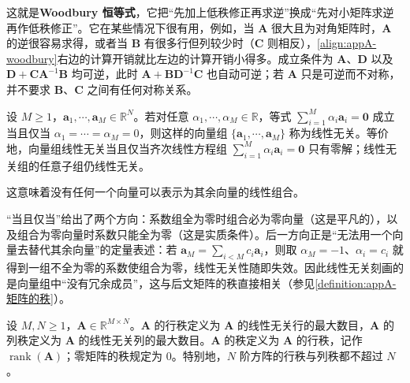 \documentclass[../main.tex]{subfiles}
\begin{document}
\begin{remark}
这就是\textbf{Woodbury 恒等式}，它把“先加上低秩修正再求逆”换成“先对小矩阵求逆再作低秩修正”。它在某些情况下很有用，例如，当 $\bm{A}$ 很大且为对角矩阵时，$\bm{A}$ 的逆很容易求得，或者当 $\bm{B}$ 有很多行但列较少时（$\bm{C}$ 则相反），\eqref{align:appA-woodbury}右边的计算开销就比左边的计算开销小得多。成立条件为 $\bm{A}$、$\bm{D}$ 以及 $\bm{D}+\bm{C}\bm{A}^{-1}\bm{B}$ 均可逆，此时 $\bm{A}+\bm{B}\bm{D}^{-1}\bm{C}$ 也自动可逆；若 $\bm{A}$ 只是可逆而不对称，并不要求 $\bm{B}$、$\bm{C}$ 之间有任何对称关系。
\end{remark}


\begin{definition}[线性无关]\label{definition:appA-线性无关}
设 $M\geqslant1$，$\bm{a}_1,\cdots,\bm{a}_M\in\mathbb{R}^{N}$。若对任意 $\alpha_1,\cdots,\alpha_M\in\mathbb{R}$，等式 $\sum_{i=1}^{M}\alpha_i\bm{a}_i=\bm{0}$ 成立当且仅当 $\alpha_1=\cdots=\alpha_M=0$，则这样的向量组 $\{\bm{a}_1,\cdots,\bm{a}_M\}$ 称为线性无关。等价地，向量组线性无关当且仅当齐次线性方程组 $\sum_{i=1}^{M}\alpha_i\bm{a}_i=\bm{0}$ 只有零解；线性无关组的任意子组仍线性无关。
\end{definition}

这意味着没有任何一个向量可以表示为其余向量的线性组合。

\begin{remark}
“当且仅当”给出了两个方向：系数组全为零时组合必为零向量（这是平凡的），以及组合为零向量时系数只能全为零（这是实质条件）。后一方向正是“无法用一个向量去替代其余向量”的定量表述：若 $\bm{a}_M=\sum_{i<M}c_i\bm{a}_i$，则取 $\alpha_M=-1$、$\alpha_i=c_i$ 就得到一组不全为零的系数使组合为零，线性无关性随即失效。因此线性无关刻画的是向量组中“没有冗余成员”，这与后文矩阵的秩直接相关（参见\cref{definition:appA-矩阵的秩}）。
\end{remark}

\begin{definition}[矩阵的秩]\label{definition:appA-矩阵的秩}
设 $M,N\geqslant1$，$\bm{A}\in\mathbb{R}^{M\times N}$。$\bm{A}$ 的行秩定义为 $\bm{A}$ 的线性无关行的最大数目，$\bm{A}$ 的列秩定义为 $\bm{A}$ 的线性无关列的最大数目。$\bm{A}$ 的秩定义为 $\bm{A}$ 的行秩，记作 $\operatorname{rank}(\bm{A})$；零矩阵的秩规定为 $0$。特别地，$N$ 阶方阵的行秩与列秩都不超过 $N$。
\end{definition}
\end{document}

